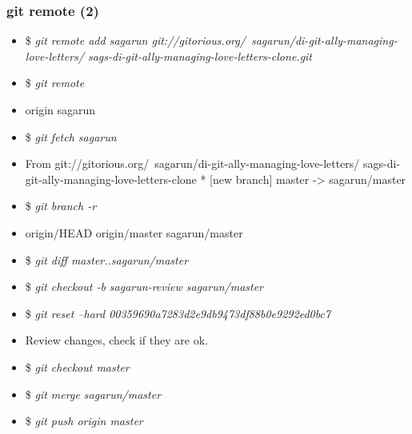 \documentclass[10pt]{beamer}
\newcommand{\command}[1]{\textsl{\textit{#1}}}
\begin{document}
\begin{frame}[fragile]
\frametitle{git remote (2)}

\begin{block}{}
\scriptsize
\begin{semiverbatim}
\begin{itemize}[<+-| alert@+>]
\item[]{\$ \command{git remote add sagarun 
    git://gitorious.org/~sagarun/di-git-ally-managing-love-letters/
      sags-di-git-ally-managing-love-letters-clone.git}}

\item[]{\$ \command{git remote}}
\item[]{origin
sagarun}

\item[]{\$ \command{git fetch sagarun}}
\item[]{From git://gitorious.org/~sagarun/di-git-ally-managing-love-letters/
sags-di-git-ally-managing-love-letters-clone
 * [new branch]      master     -> sagarun/master}

\item[]{\$ \command{git branch -r}}
\item[]{  origin/HEAD
  origin/master
  sagarun/master}

\item[]{\$ \command{git diff master..sagarun/master}}
\item[]{\$ \command{git checkout -b sagarun-review sagarun/master}}
\item[]{\$ \command{git reset --hard 00359690a7283d2e9db9473df88b0e9292ed0bc7}}

\item[]{      Review changes, check if they are ok.}
\item[]{\$ \command{git checkout master}}
\item[]{\$ \command{git merge sagarun/master}}
\item[]{\$ \command{git push origin master}}
\end{itemize}
\end{semiverbatim}
\end{block}

\end{frame}
\end{document}
